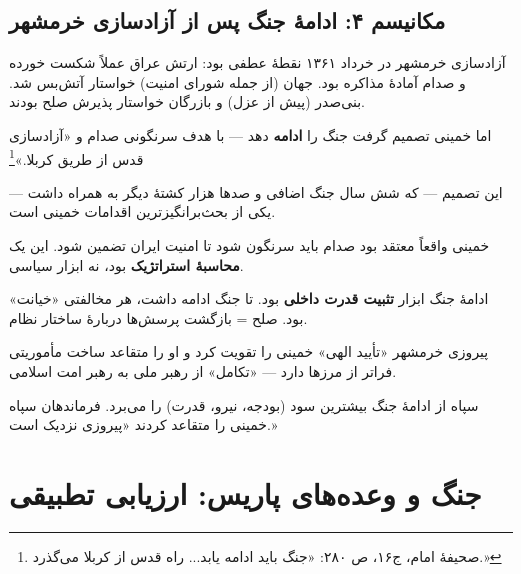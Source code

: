 \documentclass[12pt,a4paper]{book}
\newcommand{\keyword}[1]{\textbf{\textcolor{cPrimary}{#1}}}
\begin{document}
\subsection{مکانیسم ۴: ادامهٔ جنگ پس از آزادسازی خرمشهر}

\begin{noteBox}
آزادسازی خرمشهر در خرداد ۱۳۶۱ نقطهٔ عطفی بود: ارتش عراق عملاً شکست خورده و صدام آمادهٔ مذاکره بود. جهان (از جمله شورای امنیت) خواستار آتش‌بس شد. بنی‌صدر (پیش از عزل) و بازرگان خواستار پذیرش صلح بودند.

اما خمینی تصمیم گرفت جنگ را \keyword{ادامه} دهد — با هدف سرنگونی صدام و «آزادسازی قدس از طریق کربلا.»\footnote{صحیفهٔ امام، ج۱۶، ص ۲۸۰: «جنگ باید ادامه یابد... راه قدس از کربلا می‌گذرد.»}

این تصمیم — که شش سال جنگ اضافی و صدها هزار کشتهٔ دیگر به همراه داشت — یکی از بحث‌برانگیزترین اقدامات خمینی است.
\end{noteBox}

\begin{principleBox}
\begin{description}[style=nextline, font=\bfseries\color{cPrimary}]
    \item[تز ۱ (صداقت + اجبار):] خمینی واقعاً معتقد بود صدام باید سرنگون شود تا امنیت ایران تضمین شود. این یک \keyword{محاسبهٔ استراتژیک} بود، نه ابزار سیاسی.

    \item[تز ۲ (خدعه):] ادامهٔ جنگ ابزار \keyword{تثبیت قدرت داخلی} بود. تا جنگ ادامه داشت، هر مخالفتی «خیانت» بود. صلح = بازگشت پرسش‌ها دربارهٔ ساختار نظام.

    \item[تز ۳ (تکامل):] پیروزی خرمشهر «تأیید الهی» خمینی را تقویت کرد و او را متقاعد ساخت مأموریتی فراتر از مرزها دارد — «تکامل» از رهبر ملی به رهبر امت اسلامی.

    \item[تز ۴ (نخبگان):] سپاه از ادامهٔ جنگ بیشترین سود (بودجه، نیرو، قدرت) را می‌برد. فرماندهان سپاه خمینی را متقاعد کردند «پیروزی نزدیک است.»
\end{description}
\end{principleBox}

\section{جنگ و وعده‌های پاریس: ارزیابی تطبیقی}
\end{document}
